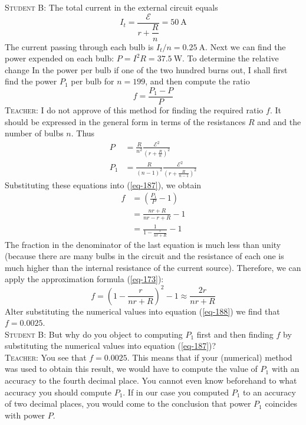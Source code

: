 \documentclass[a4paper,sfsidenotes]{tufte-book}
\newcommand{\Ea}{\mathcal{E}}
\begin{document}
\textsc{Student B:} The total current in the external circuit equals 
\begin{equation*}%
I_{t} = \frac{\Ea}{r + \dfrac{R}{n}} = \SI{50}{\ampere}
\end{equation*}
The current passing through each bulb is $I_{t}/n=\SI{0.25}{\ampere}$. Next we can find the power expended on each bulb: $P=I^{2}R=\SI{37.5}{\watt}$. To determine the relative change In the power per bulb if one of the two hundred burns out, I shall first find the power $P_{1}$ per bulb for $n= 199$, and then compute the ratio
\begin{equation}
f = \frac{P_{1}- P}{P}
\label{187}
\end{equation}
\textsc{Teacher:} I do not approve of this method for finding the required ratio $f$. It should be expressed in the general form in terms of the resistances $R$ and and the number of bulbs $n$. Thus
\begin{align*}%
P & = \frac{R}{n^{2}} \frac{\Ea^{2}}{\left( r + \frac{R}{n} \right)^{2}} \\
P_{1} & = \frac{R}{(n - 1)^{2}} \frac{\Ea^{2}}{\left( r + \frac{R}{n - 1} \right)^{2}}
\end{align*}
Substituting these equations into (\ref{eq-187}), we obtain
\begin{align*}%
f & = \left( \frac{P_{1}}{P} - 1\right) \\
& = \frac{nr+R}{nr -r +R} - 1\\
& = \frac{1}{1 - \frac{r}{nr+R}} - 1 
\end{align*}
The fraction in the denominator of the last equation is much less than unity (because there are many bulbs in the circuit and the resistance of each one is much higher than the internal resistance of the current source). Therefore, we can apply the approximation formula (\ref{eq-173}):
\begin{equation}
f = \left( 1 - \frac{r}{nr+R} \right)^{2} - 1 \approx \frac{2r}{nr+R}
\label{188}
\end{equation}
Alter substituting the numerical values into equation (\ref{eq-188}) we find that $f=0.0025$.
\\
\textsc{Student B:} But why do you object to computing $P_{1}$ first and then finding $f$ by substituting the numerical values into equation (\ref{eq-187})?
\\
\textsc{Teacher:} You see that $f=0.0025$. This means that if your (numerical) method was used to obtain this result, we would have to compute the value of $P_{1}$ with an accuracy to the fourth decimal place. You cannot even know beforehand to what accuracy you should compute $P_{1}$. If in our case you computed $P_{1}$ to an accuracy of two decimal places, you would come to the conclusion that power $P_{1}$ coincides with power $P$.
\end{document}
